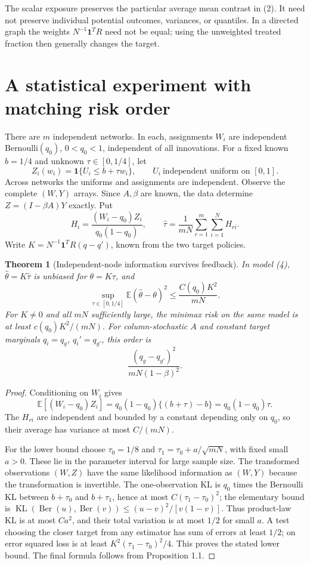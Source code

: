 \documentclass[11pt,a4paper]{article}
\newtheorem{theorem}{Theorem}[section]
\theoremstyle{remark}
\newcommand{\E}{\mathbb E}
\newcommand{\ind}{\mathbf 1}
\DeclareMathOperator{\KL}{KL}
\begin{document}
The scalar exposure preserves the particular average mean contrast in (2). It need not preserve individual potential outcomes, variances, or quantiles. In a directed graph the weights $N^{-1}\mathbf1^TR$ need not be equal; using the unweighted treated fraction then generally changes the target.

\section{A statistical experiment with matching risk order}
There are $m$ independent networks. In each, assignments $W_i$ are independent Bernoulli$(q_0)$, $0<q_0<1$, independent of all innovations. For a fixed known $b=1/4$ and unknown $\tau\in[0,1/4]$, let
\[
 Z_i(w_i)=\ind\{U_i\le b+\tau w_i\},
 \qquad U_i\ \text{independent uniform on }[0,1]. \tag{4}
\]
Across networks the uniforms and assignments are independent. Observe the complete $(W,Y)$ arrays. Since $A,\beta$ are known, the data determine $Z=(I-\beta A)Y$ exactly. Put
\[
 H_i=\frac{(W_i-q_0)Z_i}{q_0(1-q_0)},\qquad
 \widehat\tau=\frac1{mN}\sum_{r=1}^m\sum_{i=1}^NH_{ri}.
\]
Write $K=N^{-1}\mathbf1^TR(q-q')$, known from the two target policies.

\begin{theorem}[Independent-node information survives feedback]
In model (4), $\widehat\theta=K\widehat\tau$ is unbiased for $\theta=K\tau$, and
\[
 \sup_{\tau\in[0,1/4]}\E(\widehat\theta-\theta)^2
 \le \frac{C(q_0)K^2}{mN}.
\]
For $K\ne0$ and all $mN$ sufficiently large, the minimax risk on the same model is at least $c(q_0)K^2/(mN)$. For column-stochastic $A$ and constant target marginals $q_i=q_g$, $q_i'=q_{g'}$, this order is
\[
 \frac{(q_g-q_{g'})^2}{mN(1-\beta)^2}.
\]
\end{theorem}
\begin{proof}
Conditioning on $W_i$ gives
\[
 \E[(W_i-q_0)Z_i]
 =q_0(1-q_0)\{(b+\tau)-b\}
 =q_0(1-q_0)\tau.
\]
The $H_{ri}$ are independent and bounded by a constant depending only on $q_0$, so their average has variance at most $C/(mN)$.

For the lower bound choose $\tau_0=1/8$ and $\tau_1=\tau_0+a/\sqrt{mN}$, with fixed small $a>0$. These lie in the parameter interval for large sample size. The transformed observations $(W,Z)$ have the same likelihood information as $(W,Y)$ because the transformation is invertible. The one-observation KL is $q_0$ times the Bernoulli KL between $b+\tau_0$ and $b+\tau_1$, hence at most $C(\tau_1-\tau_0)^2$; the elementary bound is $\KL(\operatorname{Ber}(u),\operatorname{Ber}(v))\le(u-v)^2/[v(1-v)]$. Thus product-law KL is at most $Ca^2$, and their total variation is at most $1/2$ for small $a$. A test choosing the closer target from any estimator has sum of errors at least $1/2$; on error squared loss is at least $K^2(\tau_1-\tau_0)^2/4$. This proves the stated lower bound. The final formula follows from Proposition 1.1.
\end{proof}
\end{document}
